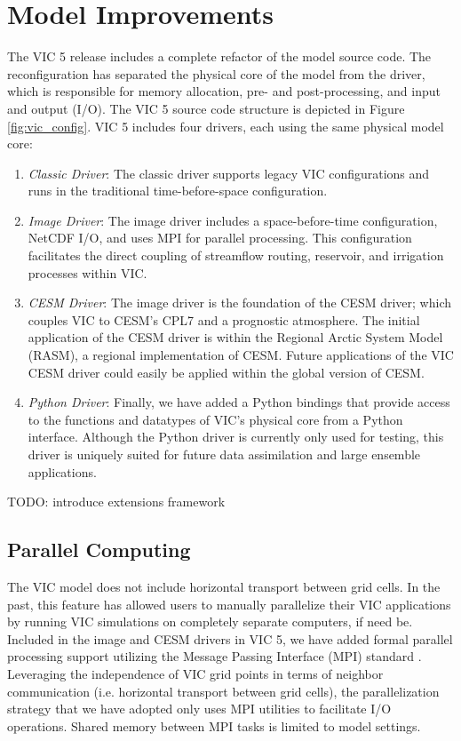 \documentclass[gmd, manuscript]{copernicus}
\begin{document}
\section{Model Improvements}
  \label{sec:improvements}
  The VIC 5 release includes a complete refactor of the model source code.
  The reconfiguration has separated the physical core of the model from the driver, which is responsible for memory allocation, pre- and post-processing, and input and output (I/O).
  The VIC 5 source code structure is depicted in Figure \ref{fig:vic_config}.
  VIC 5 includes four drivers, each using the same physical model core:
  \begin{enumerate}
    \item \textit{Classic Driver}: The classic driver supports legacy VIC configurations and runs in the traditional time-before-space configuration.
    \item \textit{Image Driver}: The image driver includes a space-before-time configuration, NetCDF I/O, and uses MPI for parallel processing.
    This configuration facilitates the direct coupling of streamflow routing, reservoir, and irrigation processes within VIC.
    \item \textit{CESM Driver}: The image driver is the foundation of the CESM driver; which couples VIC to CESM’s CPL7 and a prognostic atmosphere.
    The initial application of the CESM driver is within the Regional Arctic System Model (RASM), a regional implementation of CESM.
    Future applications of the VIC CESM driver could easily be applied within the global version of CESM.
    \item \textit{Python Driver}: Finally, we have added a Python bindings that provide access to the functions and datatypes of VIC’s physical core from a Python interface.
    Although the Python driver is currently only used for testing, this driver is uniquely suited for future data assimilation and large ensemble applications.
  \end{enumerate}

  TODO: introduce extensions framework

  \subsection{Parallel Computing}
    \label{sec:mpi}
    The VIC model does not include horizontal transport between grid cells.
    In the past, this feature has allowed users to manually parallelize their VIC applications by running VIC simulations on completely separate computers, if need be.
    Included in the image and CESM drivers in VIC 5, we have added formal parallel processing support utilizing the Message Passing Interface (MPI) standard \citep{Gropp_1996}.
    Leveraging the independence of VIC grid points in terms of neighbor communication (i.e. horizontal transport between grid cells), the parallelization strategy that we have adopted only uses MPI utilities to facilitate I/O operations.
    Shared memory between MPI tasks is limited to model settings.
\end{document}
